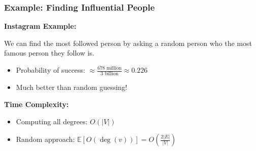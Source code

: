 \documentclass{beamer}
\begin{document}
\begin{frame}
  \frametitle{Example: Finding Influential People}
  
  \textbf{Instagram Example:}
  
  We can find the most followed person by asking a random person who the most famous person they follow is.
  
  \begin{itemize}
    \item Probability of success: $\approx \frac{678 \text{ million}}{3 \text{ billion}} \approx 0.226$
    \item Much better than random guessing!
  \end{itemize}
  
  \vspace{0.3cm}
  
  \textbf{Time Complexity:}
  \begin{itemize}
    \item Computing all degrees: $O(|V|)$
    \item Random approach: $\mathbb{E}[O(\deg(v))] = O\left(\frac{2|E|}{|V|}\right)$
  \end{itemize}
\end{frame}
\end{document}
